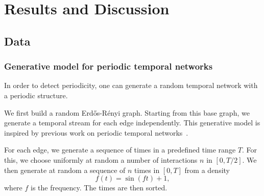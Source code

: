 \documentclass[a4paper,11pt,openany,extrafontsizes]{memoir}
\begin{document}
\chapter{Results and Discussion}%
\label{cha:results-discussion}

\section{Data}%
\label{sec:data-1}

\subsection{Generative model for periodic temporal networks}%
\label{sec:gener-model-peri}

In order to detect periodicity, one can generate a random temporal
network with a periodic structure.

We first build a random Erdős-Rényi graph. Starting from this base
graph, we generate a temporal stream for each edge independently. This
generative model is inspired by previous work on periodic temporal
networks~\cite{price-wright_topological_2015}.

For each edge, we generate a sequence of times in a predefined time
range $T$. For this, we choose uniformly at random a number of
interactions $n$ in $[0, T/2]$. We then generate at random a sequence
of $n$ times in $[0, T]$ from a density
\[ f(t) = \sin(f t) + 1, \] where $f$ is the frequency. The times are
then sorted.
\end{document}
